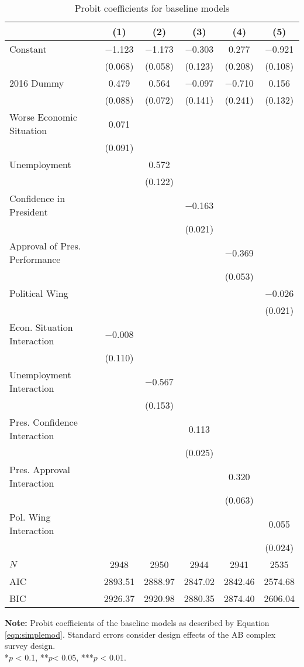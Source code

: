 \documentclass[12pt,a4]{article}
\begin{document}
\begin{table}[htbp]
\caption{Probit coefficients for baseline models}
\label{tab:probitsimp}

\begin{tabular}[t]{lccccc}
\toprule
  & (1) & (2) & (3) & (4) & (5)\\
\midrule
Constant & \num{-1.123} & \num{-1.173} & \num{-0.303} & \num{0.277} & \num{-0.921}\\
 & (\num{0.068}) & (\num{0.058}) & (\num{0.123}) & (\num{0.208}) & (\num{0.108})\\
2016 Dummy & \num{0.479} & \num{0.564} & \num{-0.097} & \num{-0.710} & \num{0.156}\\
 & (\num{0.088}) & (\num{0.072}) & (\num{0.141}) & (\num{0.241}) & (\num{0.132})\\
Worse Economic Situation & \num{0.071} &  &  &  & \\
 & (\num{0.091}) &  &  &  & \\
Unemployment &  & \num{0.572} &  &  & \\
 &  & (\num{0.122}) &  &  & \\
Confidence in President &  &  & \num{-0.163} &  & \\
 &  &  & (\num{0.021}) &  & \\
Approval of Pres. Performance &  &  &  & \num{-0.369} & \\
 &  &  &  & (\num{0.053}) & \\
Political Wing &  &  &  &  & \num{-0.026}\\
 &  &  &  &  & (\num{0.021})\\
Econ. Situation Interaction & \num{-0.008} &  &  &  & \\
 & (\num{0.110}) &  &  &  & \\
Unemployment Interaction &  & \num{-0.567} &  &  & \\
 &  & (\num{0.153}) &  &  & \\
Pres. Confidence Interaction &  &  & \num{0.113} &  & \\
 &  &  & (\num{0.025}) &  & \\
Pres. Approval Interaction &  &  &  & \num{0.320} & \\
 &  &  &  & (\num{0.063}) & \\
Pol. Wing Interaction &  &  &  &  & \num{0.055}\\
 &  &  &  &  & (\num{0.024})\\
\midrule
$N$ & \num{2948} & \num{2950} & \num{2944} & \num{2941} & \num{2535}\\
AIC & \num{2893.51} & \num{2888.97} & \num{2847.02} & \num{2842.46} & \num{2574.68}\\
BIC & \num{2926.37} & \num{2920.98} & \num{2880.35} & \num{2874.40} & \num{2606.04}\\
\bottomrule
\end{tabular}


\vspace{0.25cm}
\textbf{Note:} Probit coefficients of the baseline models as described by Equation \ref{eqn:simplemod}. Standard errors consider design effects of the AB complex survey design.\\
*$p$ < 0.1, **$p$< 0.05, ***$p$ < 0.01.
\end{table}
\end{document}
